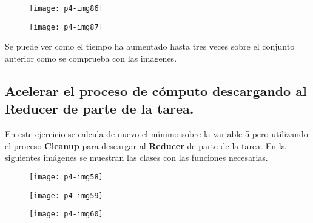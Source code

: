 \documentclass[10pt]{article}
\begin{document}
\begin{figure}[H]
	\begin{center}
 		\texttt{[image: p4-img86]}
	\end{center} 
\end{figure}

\begin{figure}[H]
	\begin{center}
 		\texttt{[image: p4-img87]}
	\end{center} 
\end{figure}

Se puede ver como el tiempo ha aumentado hasta tres veces sobre el conjunto anterior como se comprueba con las imagenes.\\

\subsection{Acelerar el proceso de cómputo descargando al Reducer de parte de la tarea.}
En este ejercicio se calcula de nuevo el mínimo sobre la variable 5 pero utilizando el proceso \textbf{Cleanup} para descargar al \textbf{Reducer} de parte de la tarea. En la siguientes imágenes se muestran las clases con las funciones necesarias.\\

\begin{figure}[H]
	\begin{center}
 		\texttt{[image: p4-img58]}
	\end{center} 
\end{figure}

\begin{figure}[H]
	\begin{center}
 		\texttt{[image: p4-img59]}
	\end{center} 
\end{figure}

\begin{figure}[H]
	\begin{center}
 		\texttt{[image: p4-img60]}
	\end{center} 
\end{figure}
\end{document}
